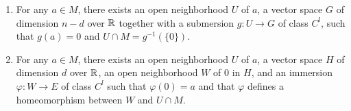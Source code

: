 \begin{theoremenv}
\begin{enumerate}[label=(\arabic*)]
\begin{figure}[H]
            \end{figure}
        \item For any $a \in M$, there exists an open neighborhood $U$ of $a$, a vector space $G$ of dimension $n - d$ over $\mathbb{R}$ together with a submersion $g : U \longrightarrow G$ of class $C^l$,
            such that $g(a) = 0$ and $U \cap M = g^{-1}(\{0\})$.
        \item For any $a \in M$, there exists an open neighborhood $U$ of $a$,
            a vector space $H$ of dimension $d$ over $\mathbb{R}$,
            an open neighborhood $W$ of $0$ in $H$, and an immersion $\varphi : W \longrightarrow E$ of class $C^l$ such that $\varphi(0) = a$ and that $\varphi$ defines a homeomorphism between $W$ and $U \cap M$.
    \end{enumerate}
\end{theoremenv}
